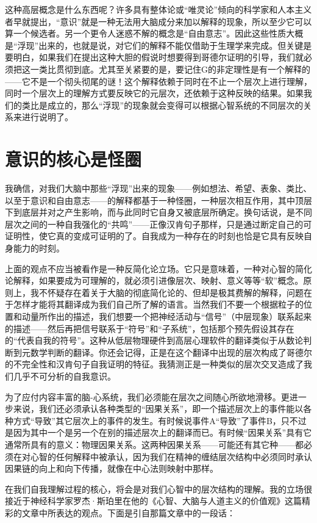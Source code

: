 这种高层概念是什么东西呢？许多具有整体论或“唯灵论”倾向的科学家和人本主义者早就提出，“意识”就是一种无法用大脑成分来加以解释的现象，所以至少它可以算一个候选者。另一个更令人迷惑不解的概念是“自由意志”。因此这些性质大概是“浮现”出来的，也就是说，对它们的解释不能仅借助于生理学来完成。但关键是要明白，如果我们在提出这种大胆的假说时想要得到哥德尔证明的引导，我们就必须把这一类比贯彻到底。尤其至关紧要的是，要记住G的非定理性是有一个解释的——它不是一个彻头彻尾的谜！这个解释依赖于同时在不止一个层次上进行理解，同时一个层次上的理解方式要反映它的元层次，还依赖于这种反映的结果。如果我们的类比是成立的，那么“浮现”的现象就会变得可以根据心智系统的不同层次的关系来进行说明了。

\section{意识的核心是怪圈}

我确信，对我们大脑中那些“浮现”出来的现象——例如想法、希望、表象、类比、以至于意识和自由意志——的解释都基于一种怪圈，一种层次相互作用，其中顶层下到底层并对之产生影响，而与此同时它自身又被底层所确定。换句话说，是不同层次之间的一种自我强化的“共鸣”——正像汉肯句子那样，只是通过断定自己的可证明性，使它真的变成可证明的了。自我成为一种存在的时刻也恰是它具有反映自身能力的时刻。

上面的观点不应当被看作是一种反简化论立场。它只是意味着，一种对心智的简化论解释，如果要成为可理解的，就必须引进像层次、映射、意义等等“软”概念。原则上，我不怀疑存在着关于大脑的彻底简化论的、但却是极其费解的解释，问题在于怎样才能将其翻译成为我们自己所了解的语言。当然我们不要一个根据粒子的位置和动量所作出的描述，我们想要一个把神经活动与“信号”（中层现象）联系起来的描述——然后再把信号联系于“符号”和“子系统”，包括那个预先假设其存在的“代表自我的符号”。这种从低层物理硬件到高层心理软件的翻译类似于从数论判断到元数学判断的翻译。你还会记得，正是在这个翻译中出现的层次构成了哥德尔的不完全性和汉肯句子自我证明的特征。我猜测正是一种类似的层次交叉造成了我们几乎不可分析的自我意识。

为了应付内容丰富的脑-心系统，我们必须能在层次之间随心所欲地滑移。更进一步来说，我们还必须承认各种类型的“因果关系”，即一个描述层次上的事件能以各种方式“导致”其它层次上的事件的发生。有时候说事件A“导致”了事件B，只不过是因为其中一个是另一个在别的描述层次上的翻译而已。有时候“因果关系”具有它通常所具有的意义：物理因果关系。这两种因果关系——可能还有其它种——都必须在对心智的任何解释中被承认，因为我们在精神的缠结层次结构中必须同时承认因果链的向上和向下传播，就像在中心法则映射中那样。

在我们自我理解过程的核心，将会是对我们心智中的层次结构的理解。我的立场很接近于神经科学家罗杰·斯珀里在他的《心智、大脑与人道主义的价值观》这篇精彩的文章中所表达的观点。下面是引自那篇文章中的一段话：

